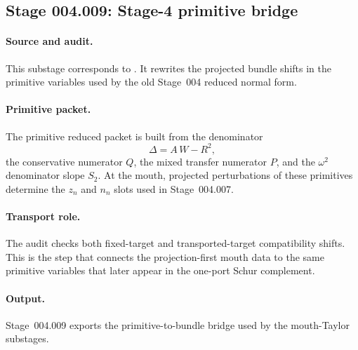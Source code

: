 \subsection*{Stage 004.009: Stage-4 primitive bridge}
\label{subsec:stage004009-stage4-primitive-bridge}

\paragraph{Source and audit.}
This substage corresponds to
.
It rewrites the projected bundle shifts in the primitive variables used by the
old Stage~004 reduced normal form.

\paragraph{Primitive packet.}
The primitive reduced packet is built from the denominator
\[
\Delta=A\,W-R^2,
\]
the conservative numerator \(Q\), the mixed transfer numerator \(P\), and the
\(\omega^2\) denominator slope \(S_2\).  At the mouth, projected perturbations
of these primitives determine the \(z_n\) and \(n_n\) slots used in
Stage~004.007.

\paragraph{Transport role.}
The audit checks both fixed-target and transported-target compatibility
shifts.  This is the step that connects the projection-first mouth data to the
same primitive variables that later appear in the one-port Schur complement.

\paragraph{Output.}
Stage~004.009 exports the primitive-to-bundle bridge used by the mouth-Taylor
substages.
